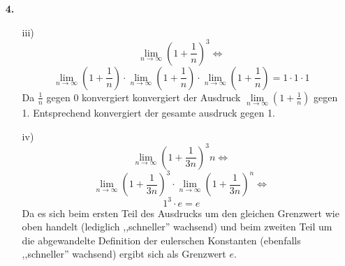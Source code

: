 \documentclass[a4paper]{scrartcl}
\begin{document}
\begin{enumerate}
    \item[\textbf{4.}]
        \begin{enumerate}
            \item[iii)]
                $$\lim\limits_{n \rightarrow \infty}\left(1+ \frac{1}{n} \right)^3 \Leftrightarrow$$
                $$\lim\limits_{n \rightarrow \infty}\left(1+ \frac{1}{n} \right) \cdot \lim\limits_{n \rightarrow \infty}\left(1+ \frac{1}{n} \right) \cdot \lim\limits_{n \rightarrow \infty}\left(1+ \frac{1}{n} \right) = 1 \cdot 1 \cdot 1$$
                Da $\frac{1}{n}$ gegen 0 konvergiert konvergiert der Ausdruck $\lim\limits_{n \rightarrow \infty}\left(1+ \frac{1}{n} \right)$ gegen 1.
                Entsprechend konvergiert der gesamte ausdruck gegen 1.
            \item[iv)]
                $$\lim\limits_{n \rightarrow \infty}\left(1+ \frac{1}{3n} \right)^3n \Leftrightarrow$$
                $$\lim\limits_{n \rightarrow \infty}\left(1+ \frac{1}{3n} \right)^3 \cdot \lim\limits_{n \rightarrow \infty}\left(1+ \frac{1}{3n} \right)^n \Leftrightarrow $$
                $$1^3 \cdot e = e$$
                Da es sich beim ersten Teil des Ausdrucks um den gleichen Grenzwert wie oben handelt (lediglich ,,schneller'' wachsend) und beim zweiten Teil um die abgewandelte Definition der eulerschen Konstanten (ebenfalls ,,schneller'' wachsend) ergibt sich als Grenzwert $e$.


        \end{enumerate}
\end{enumerate}
\end{document}
